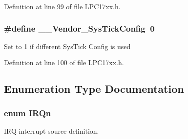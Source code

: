 \-Definition at line 99 of file \-L\-P\-C17xx.\-h.

\hypertarget{group___l_p_c17xx___system_gab58771b4ec03f9bdddc84770f7c95c68}{
\subsubsection[{\-\_\-\-\_\-\-Vendor\-\_\-\-Sys\-Tick\-Config}]{\setlength{\rightskip}{0pt plus 5cm}\#define {\bf \-\_\-\-\_\-\-Vendor\-\_\-\-Sys\-Tick\-Config}~0}}\label{group___l_p_c17xx___system_gab58771b4ec03f9bdddc84770f7c95c68}
\-Set to 1 if different \-Sys\-Tick \-Config is used 

\-Definition at line 100 of file \-L\-P\-C17xx.\-h.



\subsection{\-Enumeration \-Type \-Documentation}
\hypertarget{group___l_p_c17xx___system_ga666eb0caeb12ec0e281415592ae89083}{
\subsubsection[{\-I\-R\-Qn}]{\setlength{\rightskip}{0pt plus 5cm}enum {\bf \-I\-R\-Qn}}}\label{group___l_p_c17xx___system_ga666eb0caeb12ec0e281415592ae89083}


\-I\-R\-Q interrupt source definition. 

